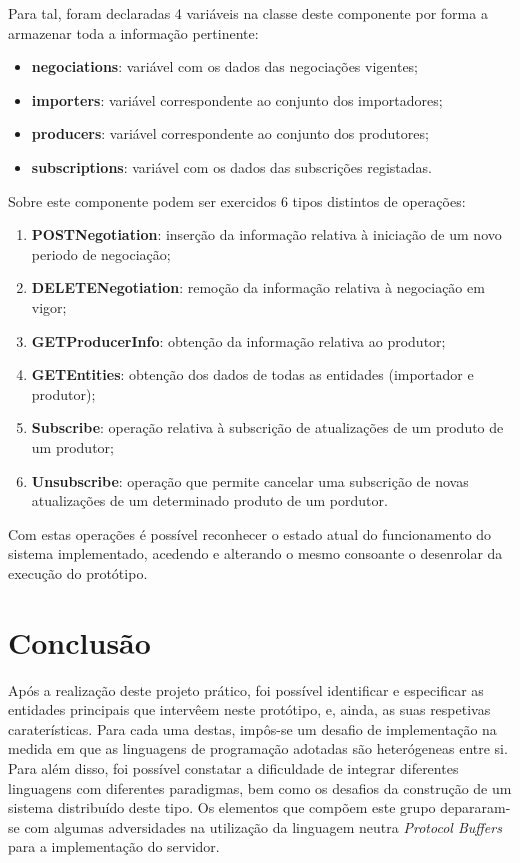 \documentclass[a4paper]{report}
\begin{document}
	Para tal, foram declaradas 4 variáveis na classe deste componente por forma a armazenar toda a informação pertinente:
	\begin{itemize}
		\item \textbf{negociations}: variável com os dados das negociações vigentes;
		\item \textbf{importers}: variável correspondente ao conjunto dos importadores;
		\item \textbf{producers}: variável correspondente ao conjunto dos produtores;
		\item \textbf{subscriptions}: variável com os dados das subscrições registadas.
	\end{itemize}
	Sobre este componente podem ser exercidos 6 tipos distintos de operações:
	\begin{enumerate}
		\item \textbf{POSTNegotiation}: inserção da informação relativa à iniciação de um novo periodo de negociação;
		\item \textbf{DELETENegotiation}: remoção da informação relativa à negociação em vigor;
		\item \textbf{GETProducerInfo}: obtenção da informação relativa ao produtor;
		\item \textbf{GETEntities}: obtenção dos dados de todas as entidades (importador e produtor);
		\item \textbf{Subscribe}: operação relativa à subscrição de atualizações de um produto de um produtor;
		\item \textbf{Unsubscribe}: operação que permite cancelar uma subscrição de novas atualizações de um determinado produto de um pordutor.
	\end{enumerate}
	Com estas operações é possível reconhecer o estado atual do funcionamento do sistema implementado, acedendo e alterando o mesmo consoante o desenrolar da execução do protótipo.

\chapter{Conclusão}
Após a realização deste projeto prático, foi possível identificar e especificar as entidades principais que intervêem neste protótipo, e, ainda, as suas respetivas caraterísticas. Para cada uma destas, impôs-se um desafio 
de implementação na medida em que as linguagens de programação adotadas são heterógeneas entre si.
Para além disso, foi possível constatar a dificuldade de integrar diferentes linguagens com diferentes paradigmas, bem como os desafios da construção de um sistema distribuído deste tipo.
Os elementos que compõem este grupo depararam-se com algumas adversidades na utilização da linguagem neutra \textit{Protocol Buffers} para a implementação do servidor.
\end{document}
